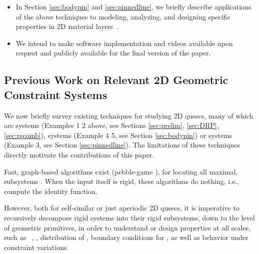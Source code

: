 \begin{itemize}
  \item In Section \ref{sec:bodypin} and \ref{sec:pinnedline}, we briefly describe applications of the above techniques to modeling, analyzing, and designing specific properties in 2D material layers~\cite{Jackson2008bodypin}.

  \item We intend to make software implementation and videos available upon request and publicly available for the final version of the paper.
\end{itemize}





\subsection{Previous Work on Relevant 2D Geometric Constraint Systems}
\label{sec:intro:prevwork}

We now briefly survey existing techniques for studying 2D qusecs,  many of which are  systems (Examples 1\cutout{,}  2 above, see Sections \ref{sec:prelim}, \ref{sec:DRP},  \ref{sec:recomb}),  systems (Example 4\cutout{,}  5, see Section \ref{sec:bodypin}) or  systems (Example 3, see Section \ref{sec:pinnedline}). The limitations of these techniques directly motivate the contributions of this paper.

\medskip\noindent
{}
Fast, graph-based algorithms exist (pebble-game \cite{Jacobs:1997:PG,lee2005finding}), for locating all maximal,  subsystems \seedefs. When the input itself is rigid, these algorithms do nothing, i.e., compute the identity function.

However, both for self-similar or just aperiodic 2D qusecs, it is imperative to recursively decompose rigid systems into their rigid subsystems, down to the level of geometric primitives, in order to understand or design properties at all scales, such as \seedefs\ , , distribution of , boundary conditions for , as well as behavior under constraint variations.

